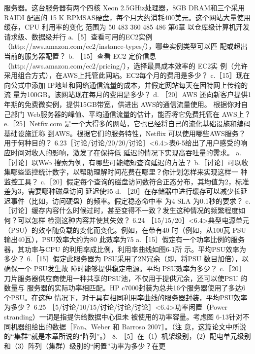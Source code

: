 服务器。这台服务器有两个四核 Xeon 2.5GHiz处理器，8GB DRAM和三个采用 RAIDI 配置的
15 K RPMSAS硬盘，每个月大约消耗400美元。这个网站大量使用缓存，CPU 利用率的变化
范围为 50%
483
360
485
486
第6章 以仓库级计算机开发请求级、数据级并行
a.［5］查看可用的EC2实例（http://aws.amazon.com/ec2/instance-types/），哪些实例类型可以匹
配或超出当前的服务器配置？
b. ［15］查看 EC2 定价信息 （http://aws.amazon.com/ec2/pricing/），选择最具成本效率的 EC2实
例（允许采用组合方式），在AWS上托管此网站。EC2每个月的费用是多少？
c.［15］现在向公式中添加 IP地址和网络通信流量的成本，并假定网站每天在因特网上传输的流
量为100GB。该网站现在每月的费用是多少？
d. ［20］AWS 还向新客户提供1年期的免费微实例，提供15GB带宽，供进出 AWS的通信流量使用。
根据你对自己部门 Web服务器的峰值、平均通信流量的估计，能否将它免费托管在 AWS上？
e.［25］Netfix.com 是一个大得多的网站，它也已经将自己的流化基础设施和编码基础设施迁称
到AWS。根据它们的服务特性，Netflix 可以使用哪些AWS服务？用于何种目的？
6.23［讨论/讨论/20/20/讨论］<6.4>表6-5给出了用户感受的响应时间对收人的影响，激发了在保持低
延迟的情况下实现高吞吐量的需求。
a.［讨论］以Web 搜索为例，有哪些可能缩短查询延迟的方法？
b.［讨论］可以收集哪些监控统计数字，以帮助理解时间花费在哪里？你计划怎样来实现这样一
种监控工具？
c.［20］假定每个查询的磁盘访问数符合正态分布，其均值为2，标准差为3，需要哪种磁盘访问
延迟使95%
d. ［20］在存储器中进行缓存可以减少长延迟事件（比如，访问硬盘）的频率。假定稳态命中率
为4%
SLA 为0.1秒的要求？
e. ［讨论］缓存内容什么时候过时，甚至变得不一致？发生这种情况的频繁程度如何？可以怎样
检测这种内容并使其失效？
6.24
［15/15/20］<6.4>典型电源单元（PSU）的效率随负载的变化而变化。例如，在带有40%
时（例如，从100瓦 PSU输出40瓦），PSU效率大约为80%
此效率为75%
a.［15］假定有一个功率比例的服务器，其功率与CPU 的利用率成比例，利用率曲线如图6-1所
示。平均PSU效率为多少？
6.［15］假定此服务器为 PSU采用了2N冗余（即，将PSU 数目加倍），以确保一个 PSU发生故
障时能够提供稳定电源。平均 PSU效率为多少？
c.［20］刀片服务器供应商使用一种共享的PSU池，不仅用于提供冗余，还可以使PSU 的数量与
服务器的实际功率相匹配。HP c7000封装为总共16个服务器使用了多达6个PSU。在这种
情况下，对于具有相同利用率曲线的服务器封装，平均PSU效率为多少？
6.25
［5/讨论/10/15/讨论/讨论/讨论］<6.4>功率闲置（Power stranding）一词是指提供给数据中心但未
被使用的功率容量。考虑图 6-13针对不同机器组给出的数据［Fan、Weber 和 Barroso 2007］。（注
意，这篇论文中所说的“集群”就是本章所说的“阵列”。）
8. ［5］在（1）机架级别，（2）配电单元级别和（3）阵列（集群）级别的“闲置”功率为多少？在更
